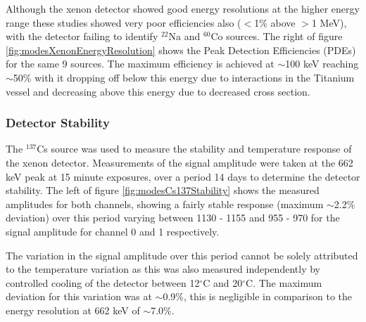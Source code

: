 Although the xenon detector showed good energy resolutions at the higher energy range these studies showed very poor efficiencies also ($<$1\% above $>$1 MeV), with the detector failing to identify $^{22}$Na and $^{60}$Co sources. The right of figure \ref{fig:modesXenonEnergyResolution} shows the Peak Detection Efficiencies (PDEs) for the same 9 sources. The maximum efficiency is achieved at $\sim$100 keV reaching $\sim$50\% with it dropping off below this energy due to interactions in the Titanium vessel and decreasing above this energy due to decreased cross section.

\subsubsection{Detector Stability}
The $^{137}$Cs source was used to measure the stability and temperature response of the xenon detector. Measurements of the signal amplitude were taken at the 662 keV peak at 15 minute exposures, over a period 14 days to determine the detector stability. The left of figure \ref{fig:modesCs137Stability} shows the measured amplitudes for both channels, showing a fairly stable response (maximum $\sim$2.2\% deviation) over this period varying between 1130 - 1155 and 955 - 970 for the signal amplitude for channel 0 and 1 respectively.

The variation in the signal amplitude over this period cannot be solely attributed to the temperature variation as this was also measured independently by controlled cooling of the detector between 12$^{\circ}$C and 20$^{\circ}$C. The maximum deviation for this variation was at $\sim$0.9\%, this is negligible in comparison to the energy resolution at 662 keV of $\sim$7.0\%.

